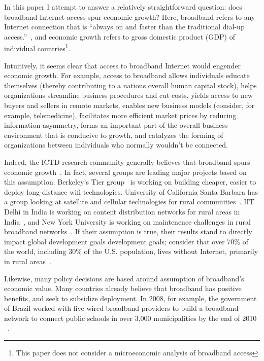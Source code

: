 In this paper I attempt to answer a relatively straightforward question: does
broadband Internet access spur economic growth? Here, broadband refers to any
Internet connection that is ``always on and faster than the traditional dial-up
access.''~\cite{fcc_bband}, and economic growth refers to gross domestic
product (GDP) of individual countries\footnote{This paper does not consider
a microeconomic analysis of broadband access}.

Intuitively, it seems clear that access to broadband Internet would engender
economic growth. For example, access to
broadband allows individuals educate themselves (thereby contributing to a
nations overall human capital stock), helps organizations streamline business
procedures and cut costs, yields access to new buyers and sellers in remote markets,
enables new business models (consider, for example, telemedicine),
facilitates more efficient market prices by reducing
information asymmetry, forms an important part of the overall business environment
that is conducive to growth, and catalyzes the forming of
organizations between individuals who normally wouldn’t be connected.

Indeed, the ICTD research community generally believes that broadband
spurs economic growth~\cite{brewer2005case}. In fact, several groups are leading major
projects based on this assumption. Berkeley's Tier group~\cite{tier} is working on
building cheaper, easier to deploy long-distance wifi technologies. University of California Santa Barbara has a
group looking at satellite and cellular technologies for rural communities~\cite{ucsb}.
IIT Delhi in India is working on content distribution networks for rural areas
in India~\cite{mahla2012motivation}, and New York University is working on
maintenence challenges in rural broadband networks~\cite{surana2008beyond}.
If their assumption is true, their results stand to directly impact global
development goals development goals; consider that over 70\% of the world, including
30\% of the U.S. population, lives without Internet, primarily in rural areas~\cite{rural_stats}.

Likewise, many policy decisions are based around assumption of broadband's
economic value. Many countries already
believe that broadband has positive benefits, and seek to subsidize
deployment. In 2008, for example, the government of Brazil worked with
five wired broadband providers to build a broadband network to connect public
schools in over 3,000 municipalities by the end of 2010 ~\cite{gazeta}.

